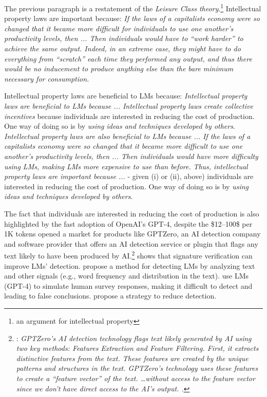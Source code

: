 \documentclass{article} %
\begin{document}
The previous paragraph is a restatement of the \emph{Leisure Class theory}.\footnote{an argument for intellectual property}
Intellectual property laws are important because:    \emph{If the laws of a capitalists economy were so changed that it became more difficult for individuals to use one another's productivity levels, then ... Then individuals would have to ``work harder'' to achieve the same output. Indeed, in an extreme case, they might have to do everything from ``scratch'' each time they performed any output, and thus there would be no inducement to produce anything else than the bare minimum necessary for consumption.}


Intellectual property laws are beneficial to LMs because:  \emph{Intellectual property laws are beneficial to LMs because ...} \emph{Intellectual property laws create collective incentives} because individuals are interested in reducing the cost of production. One way of doing so is by \emph{using ideas and techniques developed by others}. \emph{Intellectual property laws are also beneficial to LMs because ...} \emph{If the laws of a capitalists economy were so changed that it became more difficult to use one another's productivity levels, then ... Then individuals would have more difficulty using LMs, making LMs more expensive to use than before.} \emph{Thus, intellectual property laws are important because ...} - given (i) or (ii), above) individuals are interested in reducing the cost of production. One way of doing so is by \emph{using ideas and techniques developed by others}.


The fact that individuals are interested in reducing the cost of production is also highlighted by the fast adoption of OpenAI's GPT-4, despite the \$12--100\$ per 1K tokens opened a market for products like GPTZero, an AI detection company and software provider that offers an AI detection service or plugin that flags any text likely to have been produced by AI.\footnote{\citet{gptzero_technology}: \emph{GPTZero's AI detection technology flags text likely generated by AI using two key methods: Features Extraction and Feature Filtering. First, it \textit{extracts distinctive features from the text}. These features are created by the unique patterns and structures in the text. GPTZero's technology uses these features to create a ``feature vector'' of the text. \dots without access to the feature vector since we don't have direct access to the AI's output. .}}
\citet{hazramartahallucination} shows that signature verification can improve LMs' detection.
\citet{hansspotting} propose a method for detecting LMs by analyzing text and other signals (e.g., word frequency and distribution in the text).
\citet{argyle2023out} use LMs (GPT-4) to simulate human survey responses, making it difficult to detect and leading to false conclusions.
\citet{wang2024economic} propose a strategy to reduce detection.
\end{document}
